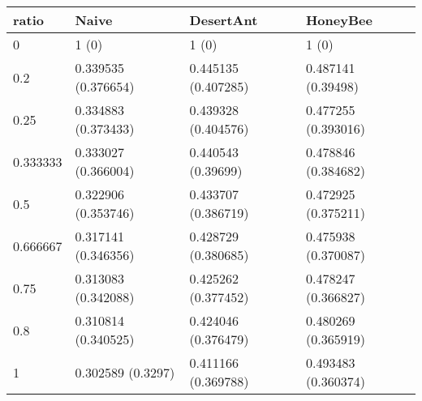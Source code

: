 \begin{tabular} {|l|l|l|l|}
\hline
ratio & Naive & DesertAnt & HoneyBee \\
\hline
0 & 1 (0)  & 1 (0)  & 1 (0)  \\
0.2 & 0.339535 (0.376654)  & 0.445135 (0.407285)  & 0.487141 (0.39498)  \\
0.25 & 0.334883 (0.373433)  & 0.439328 (0.404576)  & 0.477255 (0.393016)  \\
0.333333 & 0.333027 (0.366004)  & 0.440543 (0.39699)  & 0.478846 (0.384682)  \\
0.5 & 0.322906 (0.353746)  & 0.433707 (0.386719)  & 0.472925 (0.375211)  \\
0.666667 & 0.317141 (0.346356)  & 0.428729 (0.380685)  & 0.475938 (0.370087)  \\
0.75 & 0.313083 (0.342088)  & 0.425262 (0.377452)  & 0.478247 (0.366827)  \\
0.8 & 0.310814 (0.340525)  & 0.424046 (0.376479)  & 0.480269 (0.365919)  \\
1 & 0.302589 (0.3297)  & 0.411166 (0.369788)  & 0.493483 (0.360374)  \\
\hline
\end{tabular}
